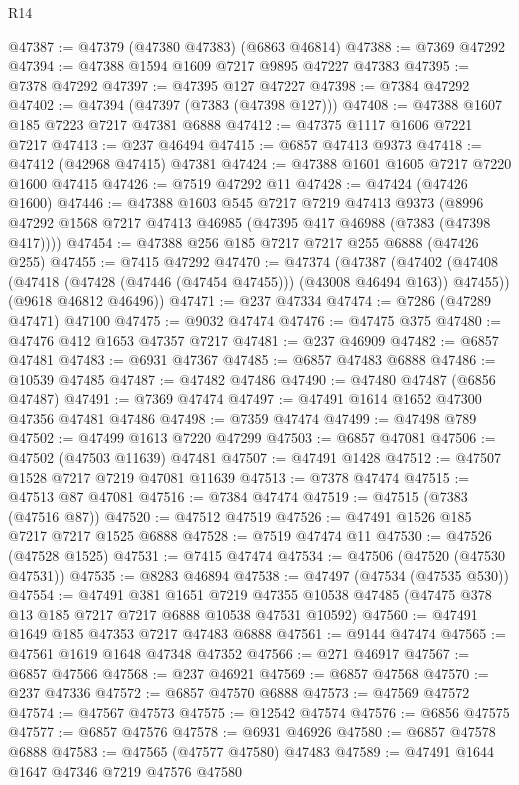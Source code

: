 \begin{lexlean}{R14}
\begin{coremodule}
@47387 := @47379 (@47380 @47383) (@6863 @46814)
@47388 := @7369 @47292
@47394 := @47388 @1594 @1609 @7217 @9895 @47227 @47383
@47395 := @7378 @47292
@47397 := @47395 @127 @47227
@47398 := @7384 @47292
@47402 := @47394 (@47397 (@7383 (@47398 @127)))
@47408 := @47388 @1607 @185 @7223 @7217 @47381 @6888
@47412 := @47375 @1117 @1606 @7221 @7217
@47413 := @237 @46494
@47415 := @6857 @47413 @9373
@47418 := @47412 (@42968 @47415) @47381
@47424 := @47388 @1601 @1605 @7217 @7220 @1600 @47415
@47426 := @7519 @47292 @11
@47428 := @47424 (@47426 @1600)
@47446 := @47388
    @1603
    @545
    @7217
    @7219
    @47413
    @9373
    (@8996 @47292 @1568 @7217 @47413 @46985 (@47395 @417 @46988 (@7383 (@47398 @417))))
@47454 := @47388 @256 @185 @7217 @7217 @255 @6888 (@47426 @255)
@47455 := @7415 @47292
@47470 := @47374
    (@47387
      (@47402 (@47408 (@47418 (@47428 (@47446 (@47454 @47455))) (@43008 @46494 @163)) @47455))
      (@9618 @46812 @46496))
@47471 := @237 @47334
@47474 := @7286 (@47289 @47471) @47100
@47475 := @9032 @47474
@47476 := @47475 @375
@47480 := @47476 @412 @1653 @47357 @7217
@47481 := @237 @46909
@47482 := @6857 @47481
@47483 := @6931 @47367
@47485 := @6857 @47483 @6888
@47486 := @10539 @47485
@47487 := @47482 @47486
@47490 := @47480 @47487 (@6856 @47487)
@47491 := @7369 @47474
@47497 := @47491 @1614 @1652 @47300 @47356 @47481 @47486
@47498 := @7359 @47474
@47499 := @47498 @789
@47502 := @47499 @1613 @7220 @47299
@47503 := @6857 @47081
@47506 := @47502 (@47503 @11639) @47481
@47507 := @47491 @1428
@47512 := @47507 @1528 @7217 @7219 @47081 @11639
@47513 := @7378 @47474
@47515 := @47513 @87 @47081
@47516 := @7384 @47474
@47519 := @47515 (@7383 (@47516 @87))
@47520 := @47512 @47519
@47526 := @47491 @1526 @185 @7217 @7217 @1525 @6888
@47528 := @7519 @47474 @11
@47530 := @47526 (@47528 @1525)
@47531 := @7415 @47474
@47534 := @47506 (@47520 (@47530 @47531))
@47535 := @8283 @46894
@47538 := @47497 (@47534 (@47535 @530))
@47554 := @47491
    @381
    @1651
    @7219
    @47355
    @10538
    @47485
    (@47475 @378 @13 @185 @7217 @7217 @6888 @10538 @47531 @10592)
@47560 := @47491 @1649 @185 @47353 @7217 @47483 @6888
@47561 := @9144 @47474
@47565 := @47561 @1619 @1648 @47348 @47352
@47566 := @271 @46917
@47567 := @6857 @47566
@47568 := @237 @46921
@47569 := @6857 @47568
@47570 := @237 @47336
@47572 := @6857 @47570 @6888
@47573 := @47569 @47572
@47574 := @47567 @47573
@47575 := @12542 @47574
@47576 := @6856 @47575
@47577 := @6857 @47576
@47578 := @6931 @46926
@47580 := @6857 @47578 @6888
@47583 := @47565 (@47577 @47580) @47483
@47589 := @47491 @1644 @1647 @47346 @7219 @47576 @47580

\end{coremodule}
\end{lexlean}
